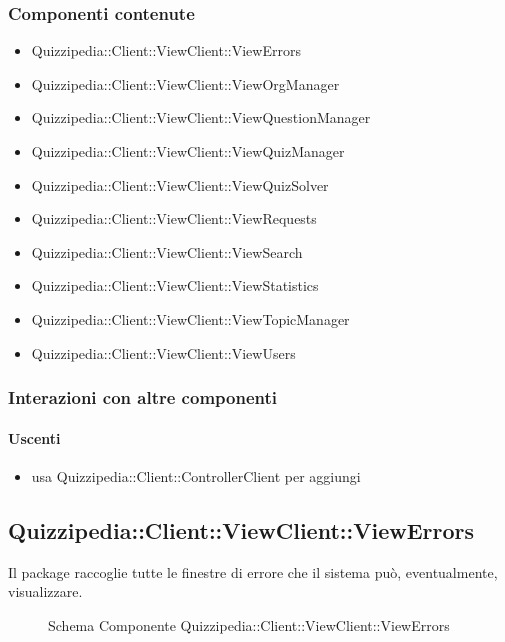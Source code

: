 \subsubsection{Componenti contenute}
\begin{itemize}
\item Quizzipedia::Client::ViewClient::ViewErrors
\item Quizzipedia::Client::ViewClient::ViewOrgManager
\item Quizzipedia::Client::ViewClient::ViewQuestionManager
\item Quizzipedia::Client::ViewClient::ViewQuizManager
\item Quizzipedia::Client::ViewClient::ViewQuizSolver
\item Quizzipedia::Client::ViewClient::ViewRequests
\item Quizzipedia::Client::ViewClient::ViewSearch
\item Quizzipedia::Client::ViewClient::ViewStatistics
\item Quizzipedia::Client::ViewClient::ViewTopicManager
\item Quizzipedia::Client::ViewClient::ViewUsers
\end{itemize}
\subsubsection{Interazioni con altre componenti}
\paragraph{Uscenti}
\begin{itemize}
\item usa Quizzipedia::Client::ControllerClient per aggiungi
\end{itemize}
\subsection{Quizzipedia::Client::ViewClient::ViewErrors}
Il package raccoglie tutte le finestre di errore che il sistema può, eventualmente, visualizzare.
\begin{figure}[H]
\centering
\noindent{}
\caption[Schema Componente Quizzipedia::Client::ViewClient::ViewErrors]{Schema Componente Quizzipedia::Client::ViewClient::ViewErrors}
\end{figure}
